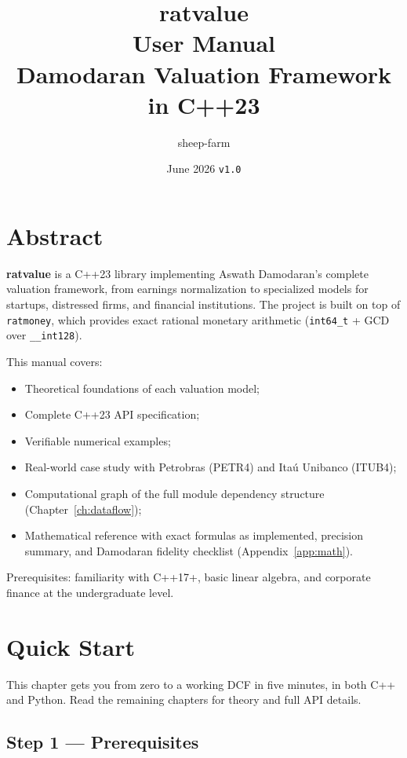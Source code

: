 \documentclass[12pt, a4paper, oneside]{book}
\title{%
  \textbf{ratvalue} \\[0.5em]
  \large User Manual \\[0.3em]
  \normalsize Damodaran Valuation Framework in C++23
}
\author{sheep-farm}
\date{June 2026 \quad \texttt{v1.0}}
\begin{document}
\maketitle
\tableofcontents

\chapter*{Abstract}

\textbf{ratvalue} is a C++23 library implementing Aswath Damodaran's complete
valuation framework, from earnings normalization to specialized models for
startups, distressed firms, and financial institutions.
The project is built on top of \texttt{ratmoney}, which provides exact rational
monetary arithmetic (\texttt{int64\_t} + GCD over \texttt{\_\_int128}).

This manual covers:
\begin{itemize}
  \item Theoretical foundations of each valuation model;
  \item Complete C++23 API specification;
  \item Verifiable numerical examples;
  \item Real-world case study with Petrobras (PETR4) and Itaú Unibanco (ITUB4);
  \item Computational graph of the full module dependency structure
        (Chapter~\ref{ch:dataflow});
  \item Mathematical reference with exact formulas as implemented, precision
        summary, and Damodaran fidelity checklist (Appendix~\ref{app:math}).
\end{itemize}

Prerequisites: familiarity with C++17+, basic linear algebra, and corporate
finance at the undergraduate level.

\chapter*{Quick Start}

This chapter gets you from zero to a working DCF in five minutes, in both
C++ and Python. Read the remaining chapters for theory and full API details.

\section*{Step 1 --- Prerequisites}
\end{document}

